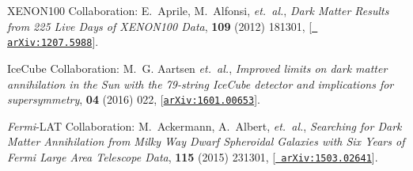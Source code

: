 \documentclass{PoS}
\begin{document}
\begin{thebibliography}{99}
XENON100 Collaboration: E.~{Aprile}, M.~{Alfonsi}, {\em et.~al.}, {\it {Dark
  Matter Results from 225 Live Days of XENON100 Data}},  {\em \prl} {\bf 109}
  (2012) 181301, [\href{http://arxiv.org/abs/1207.5988}{{\tt
  arXiv:1207.5988}}].

IceCube Collaboration: M.~G. {Aartsen} {\em et.~al.}, {\it {Improved limits on
  dark matter annihilation in the Sun with the 79-string IceCube detector and
  implications for supersymmetry}},  {\em \jcap} {\bf 04} (2016) 022,
  [\href{http://arxiv.org/abs/1601.00653}{{\tt arXiv:1601.00653}}].

  
\textit{Fermi}-LAT Collaboration: M.~{Ackermann}, A.~{Albert}, {\em et.~al.},
  {\it {Searching for Dark Matter Annihilation from Milky Way Dwarf Spheroidal
  Galaxies with Six Years of \textit{Fermi} Large Area Telescope Data}},  {\em
  \prl} {\bf 115} (2015) 231301, [\href{http://arxiv.org/abs/1503.02641}{{\tt
  arXiv:1503.02641}}].

\end{thebibliography}
\end{document}
